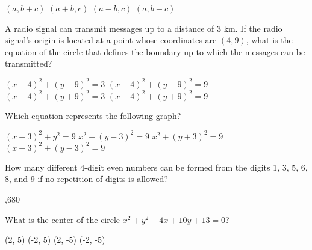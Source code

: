\begin{questions}
\begin{choices}  
\choice $(a, b+c)$ 
\CorrectChoice $(a+b, c)$ 
\choice $(a-b, c)$ \hspace*{9cm}\vspace*{-1.5cm} \vspace*{1.5cm}
\choice $(a, b-c)$ 
\end{choices}

\question A radio signal can transmit messages up to a distance of 3 km. If the radio
signal’s origin is located at a point whose coordinates are $(4, 9)$, what is
the equation of the circle that defines the boundary up to which the messages can be transmitted?

\begin{multicols}{2}
\begin{choices}  
\choice $(x-4)^2 + (y-9)^2 = 3$ 
\CorrectChoice $(x-4)^2 + (y-9)^2 = 9$ 
\choice $(x+4)^2 + (y+9)^2 = 3$
\choice $(x+4)^2 + (y+9)^2 = 9$ 
\end{choices}
\end{multicols} 

\question Which equation represents the following graph? 

\begin{choices}  
\choice $(x-3)^2 + y^2 = 9$ 
\choice $x^2 + (y-3)^2 = 9$ 
\choice $x^2 + (y+3)^2 = 9$ \hspace*{8cm} %
\CorrectChoice $(x+3)^2 + (y-3)^2 = 9$ 
\end{choices}

\question How many  different  4-digit  even  numbers can  be  formed  from  the  digits 1,  3,  5,  6,  8,  and  9  if  no  repetition  of  digits  is allowed? 
\begin{multicols}{4}
\begin{choices}  
,680
\end{choices}
\end{multicols} 

\question What is the center of the circle $x^2 + y^2 - 4x + 10y + 13 = 0$?

\begin{multicols}{4}
\begin{choices}  
\choice (2, 5)
\choice (-2, 5)
\CorrectChoice (2, -5)
\choice (-2, -5)
\end{choices}
\end{multicols} 


\end{questions}

